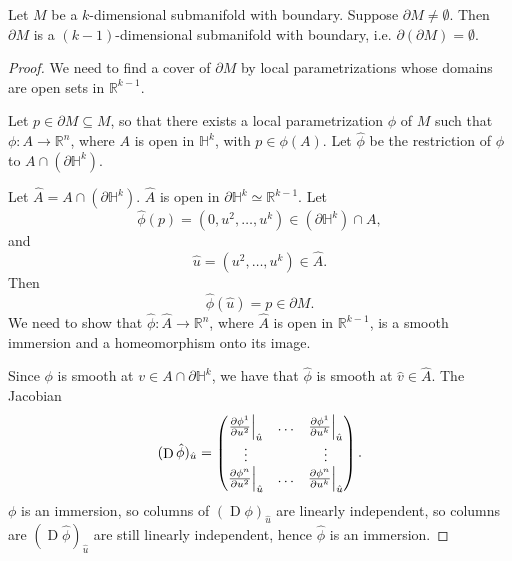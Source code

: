 \documentclass[notoc,notitlepage]{tufte-book}
\DeclareMathOperator{\D}{D}
\begin{document}
\begin{propo}\label{propo:dimension_of_the_boundary_of_a_submanifold}
  Let $M$ be a $k$-dimensional submanifold with boundary. Suppose $\partial M
  \neq \emptyset$. Then $\partial M$ is a $(k - 1)$-dimensional submanifold with
  boundary, i.e. $\partial(\partial M) = \emptyset$.
\end{propo}

\begin{proof}
  We need to find a cover of $\partial M$ by local parametrizations whose
  domains are open sets in $\mathbb{R}^{k-1}$.

  Let  $p \in \partial M \subseteq M$, so that there exists a local
  parametrization $\phi$ of $M$ such that $\phi : A \to \mathbb{R}^n$, where $A$ 
  is open in $\mathbb{H}^k$, with $p \in \phi(A)$. Let $\hat{\phi}$ be the
  restriction of $\phi$ to $A \cap (\partial \mathbb{H}^k)$.

  Let $\hat{A} = A \cap (\partial \mathbb{H}^k)$.  $\hat{A}$ is
  open in $\partial \mathbb{H}^k \simeq \mathbb{R}^{k-1}$. Let
  \begin{equation*}
    \hat{\phi}(p) = (0, u^2, \ldots, u^k) \in (\partial \mathbb{H}^k) \cap A,
  \end{equation*}
  and
  \begin{equation*}
    \hat{u} = (u^2, \ldots, u^k) \in \hat{A}.
  \end{equation*}
  Then
  \begin{equation*}
    \hat{\phi}(\hat{u}) = p \in \partial M.
  \end{equation*}
  We need to show that $\hat{\phi} : \hat{A} \to \mathbb{R}^n$, where $\hat{A}$ 
  is open in $\mathbb{R}^{k-1}$, is a smooth immersion and a homeomorphism onto
  its image.

  Since $\phi$ is smooth at $v \in A \cap \partial \mathbb{H}^k$, we have that
  $\hat{\phi}$ is smooth at $\hat{v} \in \hat{A}$. The Jacobian
  \begin{equation*}
    (\D \hat{\phi})_{\hat{u}} = \begin{pmatrix}
      \frac{\partial \phi^1}{\partial u^2} \at{\hat{u}}{} & \hdots &
      \frac{\partial \phi^1}{\partial u^k}
      \at{\hat{u}}{} \\
      \vdots & & \vdots \\
      \frac{\partial \phi^n}{\partial u^2} \at{\hat{u}}{} & \hdots & \frac{\partial \phi^n}{\partial u^k} \at{\hat{u}}{}
    \end{pmatrix}.
  \end{equation*}
  $\phi$ is an immersion, so columns of $(\D \phi)_{\hat{u}}$ are linearly
  independent, so columns are $(\D \hat{\phi})_{\hat{u}}$ are still linearly
  independent, hence $\hat{\phi}$ is an immersion.


\end{proof}
\end{document}
